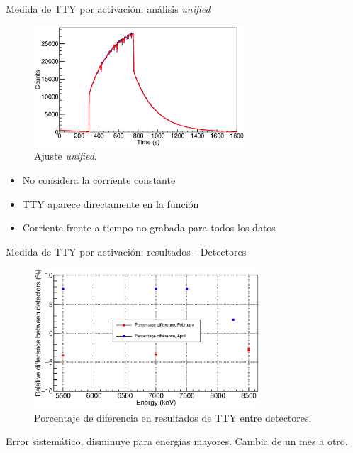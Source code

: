 \documentclass[11pt]{beamer}
\begin{document}
\begin{frame}{Medida de TTY por activación: análisis \textit{unified}}
	\begin{figure}[H]
		\centering
		\includegraphics[width=0.7\textwidth]{example_unified_fit.eps}
		\caption{Ajuste \textit{unified}.}
		\label{unified_fit}
	\end{figure}
	\begin{itemize}
		\item No considera la corriente constante
		\item TTY aparece directamente en la función
		\item Corriente frente a tiempo no grabada para todos los datos
	\end{itemize}
\end{frame}

\begin{frame}{Medida de TTY por activación: resultados - Detectores}
	\begin{figure}[H]
		\centering
		\includegraphics[width=0.75\textwidth]{decay_errors_rel_per_fixed.eps}
		\caption{Porcentaje de diferencia en resultados de TTY entre detectores.}
		\label{decay_errors_rel_per_fixed}
	\end{figure}
	Error sistemático, disminuye para energías mayores.
	Cambia de un mes a otro.
\end{frame}
\end{document}
